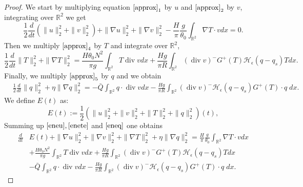 \documentclass[10pt,a4paper]{amsart}
\DeclareMathOperator{\dive}{div}
\begin{document}
\begin{proof}
We start by multiplying equation $\eqref{approx}_1$ by $u$ and $\eqref{approx}_2$ by $v$, integrating over $\mathbb{R}^2$ we get
\begin{equation}\label{eneu}
         \frac{1}{2} \frac{d}{dt} \left( \|u\|^2_2 + \|v\|^2_2  \right) +  \|\nabla u\|^2_2 +  \|\nabla v\|^2_2 
        - \frac{H}{\pi} \frac{g}{\theta_0} \int_{\mathbb{R}^2} \nabla T  \cdot v dx = 0.
\end{equation}
Then we multiply $\eqref{approx}_4$ by $T$ and integrate over $\mathbb{R}^2$,
\begin{equation}\label{enete}
    \frac{1}{2} \frac{d}{dt} \|T\|^2_2 +  \|\nabla T\|_2^2 =  \frac{H \theta_0 N^2}{\pi g} \int_{\mathbb{R}^2} T \dive v dx+ \frac{Hg}{\pi R}\int_{\mathbb{R}^2} (\dive v)^- G^+(T)\mathcal{H}_\epsilon(q-q_s) T dx.
\end{equation}
Finally, we multiply $\eqref{approx}_5$ by $q$ and we obtain
\begin{equation}\label{eneq}
\begin{aligned}
    & \frac{1}{2} \frac{d}{dt} \|q\|_2^2 + \eta \|\nabla q\|_2^2 = - \bar{Q} \int_{\mathbb{R}^2} q \cdot \dive v dx - \frac{Hg}{\pi R}\int_{\mathbb{R}^2}(\dive v)^- \mathcal{H}_\epsilon(q-q_s) G^+(T)  \cdot q \; dx.
\end{aligned}
\end{equation}
We define $E(t)$ as:
\begin{equation*}
    E(t):= \frac{1}{2} \left(\|u\|_2^2 + \|v\|_2^2 +  \|T\|_2^2 + \|q\|_2^2 \right)(t),
\end{equation*}
Summing up $\eqref{eneu}, \eqref{enete}$ and $\eqref{eneq}$ one obtains 
\begin{equation}\label{der_ene}
    \begin{aligned}
        \frac{d}{dt} & E(t)  + \|\nabla u\|_2^2 + \|\nabla v\|_2^2 +  \|\nabla T\|_2^2 + \eta \|\nabla q\|_2^2 = \frac{H}{\pi} \frac{g}{\theta_0} \int_{\mathbb{R}^2} \nabla T  \cdot v dx \\
        &  +  \frac{H \theta_0 N^2}{\pi g} \int_{\mathbb{R}^2} T \dive v dx + \frac{Hg}{\pi R}\int_{\mathbb{R}^2} (\dive v)^- G^+(T)\mathcal{H}_\epsilon(q-q_s) T dx \\
        &- \bar{Q} \int_{\mathbb{R}^2} q \cdot \dive v dx - \frac{Hg}{\pi R}\int_{\mathbb{R}^2}(\dive v)^- \mathcal{H}_\epsilon(q-q_s) G^+(T)  \cdot q \; dx.
    \end{aligned}
\end{equation}


\end{proof}
\end{document}
